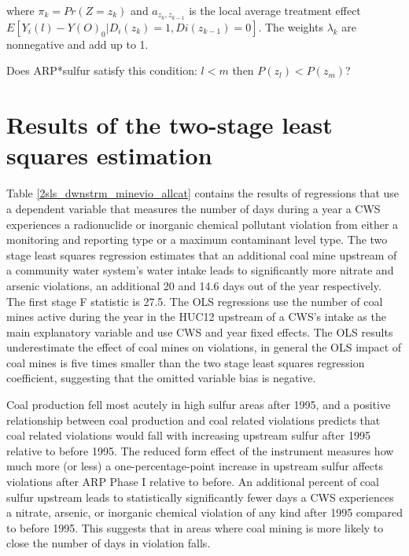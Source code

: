 \documentclass{article}
\begin{document}
where $\pi_k = Pr(Z = z_k)$ and $a_{z_k, z_{k-1}}$ is the local average treatment effect $E[Y_i(l) -Y(O)_0|D_i(z_k) = 1, Di(z_{k-1})= 0]$. The weights $\lambda_k$ are nonnegative and add up to 1.

Does ARP*sulfur satisfy this condition: $l <
m$ then $P(z_l) <P(z_m)$?

\section{Results of the two-stage least squares estimation}

Table \ref{2sls_dwnstrm_minevio_allcat} contains the results of regressions that use a dependent variable that measures the number of days during a year a CWS experiences a radionuclide or inorganic chemical pollutant violation from either a monitoring and reporting type or a maximum contaminant level type. The two stage least squares regression estimates that an additional coal mine upstream of a community water system's water intake leads to significantly more nitrate and arsenic violations, an additional 20 and 14.6 days out of the year respectively. The first stage F statistic is 27.5. The OLS regressions use the number of coal mines active during the year in the HUC12 upstream of a CWS's intake as the main explanatory variable and use CWS and year fixed effects. The OLS results underestimate the effect of coal mines on violations, in general the OLS impact of coal mines is five times smaller than the two stage least squares regression coefficient, suggesting that the omitted variable bias is negative. 

Coal production fell most acutely in high sulfur areas after 1995, and a positive relationship between coal production and coal related violations predicts that coal related violations would fall with increasing upstream sulfur after 1995 relative to before 1995. The reduced form effect of the instrument measures how much more (or less) a one-percentage-point increase in upstream sulfur affects violations after ARP Phase I relative to before. An additional percent of coal sulfur upstream leads to statistically significantly fewer days a CWS experiences a nitrate, arsenic, or inorganic chemical violation of any kind after 1995 compared to before 1995. This suggests that in areas where coal mining is more likely to close the number of days in violation falls.
\end{document}

